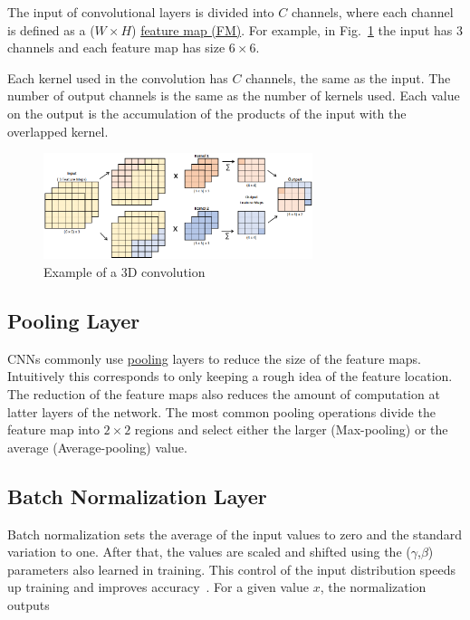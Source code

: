 The input of convolutional layers is divided into $C$ channels, where each
channel is defined as a ($W\times H$) \underline{feature map (FM)}. For example,
in Fig.~\ref{fig:3D_conv} the input has 3 channels and each feature map has size
$6\times 6$.

Each kernel used in the convolution has $C$ channels, the same as the input. The
number of output channels is the same as the number of kernels used. Each value
on the output is the accumulation of the products of the input with the
overlapped kernel.

\begin{figure}[!htb]
	\centering
	\includegraphics[width=0.70\textwidth]{Figures/3D_convolution.png}
	\caption[Caption for figure in TOC.]{Example of a 3D convolution}
	\label{fig:3D_conv}
\end{figure}


\subsection{Pooling Layer}
\label{subsection:pool_layer}
CNNs commonly use \underline{pooling} layers to reduce the size of the feature
maps. Intuitively this corresponds to only keeping a rough idea of the feature
location. The reduction of the feature maps also reduces the amount of
computation at latter layers of the network. The most common pooling operations
divide the feature map into $2\times2$ regions and select either the larger
(Max-pooling) or the average (Average-pooling) value.


\subsection{Batch Normalization Layer}
\label{subsection:batch_norm_layer}
Batch normalization sets the average of the input values to zero and the
standard variation to one. After that, the values are scaled and shifted using
the ($\gamma$,$\beta$) parameters also learned in training. This control of the
input distribution speeds up training and improves
accuracy~\cite{sze:dnn_tutorial}. For a given value $x$, the normalization
outputs

